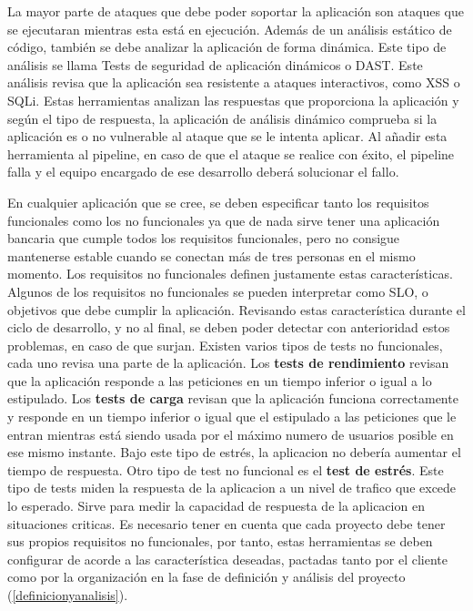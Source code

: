 \documentclass[12pt]{report} %
\begin{document}
La mayor parte de ataques que debe poder soportar la aplicación son ataques que
se ejecutaran mientras esta está en ejecución.
Además de un análisis estático de código, también se debe analizar la aplicación
de forma dinámica.
Este tipo de análisis se llama Tests de seguridad de aplicación
dinámicos o \gls{DAST}.
Este análisis revisa que la aplicación sea resistente a ataques interactivos,
como \gls{XSS} o \gls{SQLi}.
Estas herramientas analizan las respuestas que proporciona la aplicación y
según el tipo de respuesta, la aplicación de análisis dinámico comprueba si la
aplicación es o no vulnerable al ataque que se le intenta aplicar.
Al añadir esta herramienta al \gls{pipeline}, en caso de que el ataque se
realice con éxito, el \gls{pipeline} falla y el equipo encargado de ese
desarrollo deberá solucionar el fallo.

En cualquier aplicación que se cree, se deben especificar tanto los requisitos
funcionales como los no funcionales ya que de nada sirve tener una aplicación
bancaria que cumple todos los requisitos funcionales, pero no consigue
mantenerse estable cuando se conectan más de tres personas en el mismo momento.
Los requisitos no funcionales definen justamente estas características.
Algunos de los requisitos no funcionales se pueden interpretar como
\acrfull{SLO}, o objetivos que debe cumplir la aplicación.
Revisando estas característica durante el ciclo de desarrollo, y no al final, se
deben poder detectar con anterioridad estos problemas, en caso de que surjan.
Existen varios tipos de tests no funcionales, cada uno revisa una parte de la
aplicación.
Los \textbf{tests de rendimiento} revisan que la aplicación responde a las peticiones en
un tiempo inferior o igual a lo estipulado.
Los \textbf{tests de carga} revisan que la aplicación funciona correctamente y responde en
un tiempo inferior o igual que el estipulado a las peticiones que le entran
mientras está siendo usada por el máximo numero de usuarios posible en ese mismo
instante. Bajo este tipo de estrés, la aplicacion no debería aumentar el tiempo
de respuesta.
Otro tipo de test no funcional es el \textbf{test de estrés}.
Este tipo de tests miden la respuesta de la aplicacion a un nivel de trafico que
excede lo esperado. Sirve para medir la capacidad de respuesta de la aplicacion
en situaciones criticas.
Es necesario tener en cuenta que cada proyecto debe tener sus propios requisitos no
funcionales, por tanto, estas herramientas se deben configurar de acorde a las
característica deseadas, pactadas tanto por el cliente como por la organización
en la fase de definición y análisis del proyecto (\ref{definicionyanalisis}).
\end{document}
